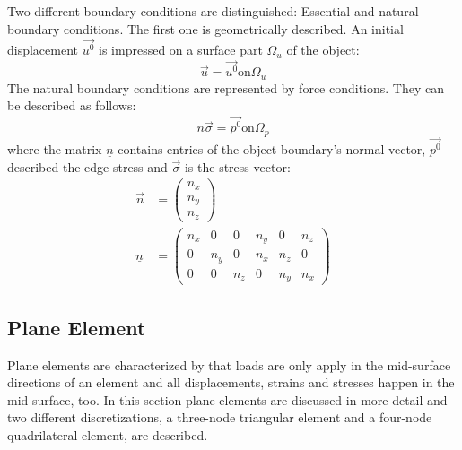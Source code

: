  Two different boundary conditions are distinguished: Essential and natural boundary conditions. The first one is geometrically described. An initial displacement $\vec{u^0}$ is impressed on a surface part $\Omega_u$ of the object:
 \begin{equation}
 \vec{u} = \vec{u^0} \text{on} \Omega_u
 \end{equation}
 The natural boundary conditions are represented by force conditions. They can be described as follows:
 \begin{equation}
 \underline{n} \vec{\sigma} = \vec{p^0} \text{on} \Omega_p
 \end{equation}
 where the matrix $\underline{n}$ contains entries of the object boundary's normal vector, $\vec{p^0}$ described the edge stress and $\vec{\sigma}$ is the stress vector:
 \begin{align}
 \vec{n} &= \begin{pmatrix}
 n_x\\n_y\\n_z
 \end{pmatrix}\\
 \underline{n} &= \begin{pmatrix}
 n_x & 0 & 0 & n_y & 0 & n_z\\
 0 & n_y & 0 & n_x & n_z & 0\\
 0 & 0 & n_z & 0 & n_y & n_x
 \end{pmatrix}
 \end{align}
 
 
 
 \subsection{Plane Element}\label{sec:Shell-Plane}
  Plane elements are characterized by that loads are only apply in the mid-surface directions of an element and all displacements, strains and stresses happen in the mid-surface, too. In this section plane elements are discussed in more detail and two different discretizations, a three-node triangular element and a four-node quadrilateral element, are described.
  
  
